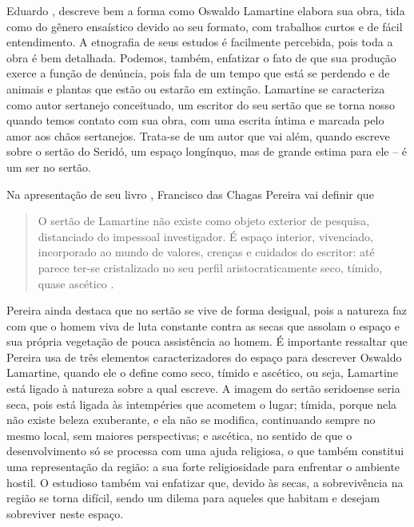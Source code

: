 \begin{refsection}
    Eduardo \textcite{MEDEIROS2019Estilo}, descreve bem a forma como Oswaldo Lamartine elabora sua obra, tida como do gênero ensaístico devido ao seu formato, com trabalhos curtos e de fácil entendimento. A etnografia de seus estudos é facilmente percebida, pois toda a obra é bem detalhada. Podemos, também, enfatizar o fato de que sua produção exerce a função de denúncia, pois fala de um tempo que está se perdendo e de animais e plantas que estão ou estarão em extinção. Lamartine se caracteriza como autor sertanejo conceituado, um escritor do seu sertão que se torna nosso quando temos contato com sua obra, com uma escrita íntima e marcada pelo amor aos chãos sertanejos. Trata-se de um autor que vai além, quando escreve sobre o sertão do Seridó, um espaço longínquo, mas de grande estima para ele – é um ser no sertão. 

    Na apresentação de seu livro , Francisco das Chagas Pereira vai definir que

    \begin{quotation}
        O sertão de Lamartine não existe como objeto exterior de pesquisa, distanciado do impessoal investigador. É espaço interior, vivenciado, incorporado ao mundo de valores, crenças e cuidados do escritor: até parece ter-se cristalizado no seu perfil aristocraticamente seco, tímido, quase ascético \cite[p.~14]{FARIA1980Sertões}.
    \end{quotation}

    Pereira ainda destaca que no sertão se vive de forma desigual, pois a natureza faz com que o homem viva de luta constante contra as secas que assolam o espaço e sua própria vegetação de pouca assistência ao homem. É importante ressaltar que Pereira usa de três elementos caracterizadores do espaço para descrever Oswaldo Lamartine, quando ele o define como seco, tímido e ascético, ou seja, Lamartine está ligado à natureza sobre a qual escreve. A imagem do sertão seridoense seria seca, pois está ligada às intempéries que acometem o lugar; tímida, porque nela não existe beleza exuberante, e ela não se modifica, continuando sempre no mesmo local, sem maiores perspectivas; e ascética, no sentido de que o desenvolvimento só se processa com uma ajuda religiosa, o que também constitui uma representação da região: a sua forte religiosidade para enfrentar o ambiente hostil. O estudioso também vai enfatizar que, devido às secas, a sobrevivência na região se torna difícil, sendo um dilema para aqueles que habitam e desejam sobreviver neste espaço.  


\end{refsection}
